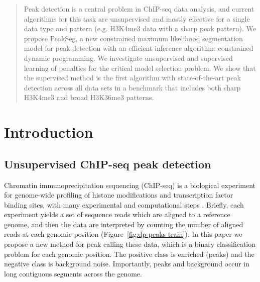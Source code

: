\documentclass{article}
\begin{document}

\begin{abstract}
  Peak detection is a central problem in ChIP-seq data analysis, and
  current algorithms for this task are unsupervised and mostly
  effective for a single data type and pattern (e.g. H3K4me3 data with
  a sharp peak pattern). We propose PeakSeg, a new constrained maximum
  likelihood segmentation model for peak detection with an efficient
  inference algorithm: constrained dynamic programming. We investigate
  un\-super\-vised and super\-vised learning of penalties for
  the critical model selection problem. We show that the 
  super\-vised method is the first algorithm with state-of-the-art peak
  detection across all data sets in a benchmark that includes both
  sharp H3K4me3 and broad H3K36me3 patterns.
\end{abstract}

\section{Introduction}

\subsection{Unsupervised ChIP-seq peak detection}

Chromatin immunoprecipitation sequencing (ChIP-seq) is a biological
experiment for genome-wide profiling of histone modifications and
transcription factor binding sites, with many experimental and
computational steps \citep{practical}. Briefly, each experiment yields
a set of sequence reads which are aligned to a reference genome, and
then the data are interpreted by counting the number of aligned reads
at each genomic position (Figure~\ref{fig:dp-peaks-train}). In this
paper we propose a new method for peak calling these data, which is a
binary classification problem for each genomic position. The positive
class is enriched (peaks) and the negative class is background
noise. Importantly, peaks and background occur in long contiguous
segments across the genome.
\end{document}
